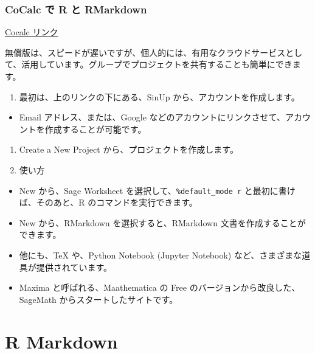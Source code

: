 \documentclass[
  xelatex, ja=standard]{bxjsbook}
\providecommand{\tightlist}{%
  \setlength{\itemsep}{0pt}\setlength{\parskip}{0pt}}
\theoremstyle{definition}
\theoremstyle{definition}
\theoremstyle{definition}
\theoremstyle{definition}
\theoremstyle{remark}
\begin{document}
\hypertarget{cocalc-ux3067-r-ux3068-rmarkdown}{%
\subsection{CoCalc で R と RMarkdown}\label{cocalc-ux3067-r-ux3068-rmarkdown}}

\href{https://cocalc.com}{Cocalc リンク}

無償版は、スピードが遅いですが、個人的には、有用なクラウドサービスとして、活用しています。グループでプロジェクトを共有することも簡単にできます。

\begin{enumerate}
\def\labelenumi{\arabic{enumi}.}
\tightlist
\item
  最初は、上のリンクの下にある、SinUp から、アカウントを作成します。
\end{enumerate}

\begin{itemize}
\tightlist
\item
  Email アドレス、または、Google などのアカウントにリンクさせて、アカウントを作成することが可能です。
\end{itemize}

\begin{enumerate}
\def\labelenumi{\arabic{enumi}.}
\setcounter{enumi}{1}
\tightlist
\item
  Create a New Project から、プロジェクトを作成します。
\item
  使い方
\end{enumerate}

\begin{itemize}
\tightlist
\item
  New から、Sage Worksheet を選択して、\texttt{\%default\_mode\ r} と最初に書けば、そのあと、R のコマンドを実行できます。
\item
  New から、RMarkdown を選択すると、RMarkdown 文書を作成することができます。
\item
  他にも、TeX や、Python Notebook (Jupyter Notebook) など、さまざまな道具が提供されています。
\item
  Maxima と呼ばれる、Maathematica の Free のバージョンから改良した、SageMath からスタートしたサイトです。
\end{itemize}

\hypertarget{rmarkdown}{%
\chapter{R Markdown}\label{rmarkdown}}
\end{document}
